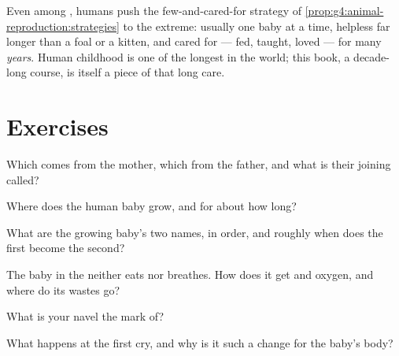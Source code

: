 \begin{example}\label{ex:g5:human-reproduction:longcare}
Even among , humans push the few-and-cared-for
strategy of \cref{prop:g4:animal-reproduction:strategies} to
the extreme: usually one baby at a time, helpless far longer
than a foal or a kitten, and cared for --- fed, taught,
loved --- for many \emph{years}. Human childhood is one of
the longest in the  world; this book, a decade-long
course, is itself a piece of that long care.
\end{example}

\section{Exercises}

\begin{exercise}[$\star$]\label{exo:g5:human-reproduction:1}
Which  comes from the mother, which from the father, and
what is their joining called?
\end{exercise}

\begin{exercise}[$\star$]\label{exo:g5:human-reproduction:2}
Where does the human baby grow, and for about how long?
\end{exercise}

\begin{exercise}[$\star$]\label{exo:g5:human-reproduction:3}
What are the growing baby's two names, in order, and roughly
when does the first become the second?
\end{exercise}

\begin{exercise}[$\star$]\label{exo:g5:human-reproduction:4}
The baby in the  neither eats nor breathes. How does it
get  and oxygen, and where do its wastes go?
\end{exercise}

\begin{exercise}[$\star$]\label{exo:g5:human-reproduction:5}
What is your navel the mark of?
\end{exercise}

\begin{exercise}[$\star$]\label{exo:g5:human-reproduction:6}
What happens at the first cry, and why is it such a change
for the baby's body?
\end{exercise}

